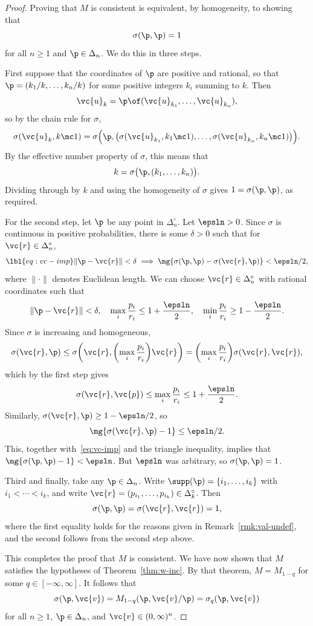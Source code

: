 \begin{proof}
Proving that $M$ is consistent is equivalent, by homogeneity, to showing that
\[
\sigma(\p, \p) = 1
\]
for all $n \geq 1$ and $\p \in \Delta_n$.  We do this in three steps.

First suppose that the coordinates of $\p$ are positive and rational, so
that $\p = (k_1/k, \ldots, k_n/k)$ for some positive integers $k_i$ summing
to $k$.  Then
\[
\vc{u}_k = \p \of (\vc{u}_{k_1}, \ldots, \vc{u}_{k_n}),
\]
so by the chain rule for $\sigma$,
\[
\sigma(\vc{u}_k, k \mc 1)
=
\sigma\Bigl(
\p, \bigl(
\sigma(\vc{u}_{k_1}, k_1 \mc 1), \ldots, \sigma(\vc{u}_{k_n}, k_n \mc 1)
\bigr)
\Bigr).
\]
By the effective number property of $\sigma$, this means that
\[
k = \sigma\bigl( \p, (k_1, \ldots, k_n)\bigr).
\]
Dividing through by $k$ and using the homogeneity of $\sigma$ gives $1 =
\sigma(\p, \p)$, as required.

For the second step, let $\p$ be any point in $\Delta_n^\circ$.  Let
$\epsln > 0$.  Since $\sigma$ is continuous in positive probabilities,
there is some $\delta > 0$ such that for $\vc{r} \in \Delta_n^\circ$,
% 
\begin{equation}
\lbl{eq:vc-imp}
\|\p - \vc{r}\| < \delta
\implies
\mg{\sigma(\p, \p) - \sigma(\vc{r}, \p)} < \epsln/2,
\end{equation}
% 
where $\|\cdot\|$ denotes Euclidean length.  We can choose $\vc{r} \in
\Delta_n^\circ$ with rational coordinates such that
\[
\|\p - \vc{r}\| < \delta,
\quad
\max_i \frac{p_i}{r_i} \leq 1 + \frac{\epsln}{2},
\quad
\min_i \frac{p_i}{r_i} \geq 1 - \frac{\epsln}{2}.
\]
Since $\sigma$ is increasing and homogeneous,
\[
\sigma(\vc{r}, \p) 
\leq
\sigma\biggl(\vc{r}, \biggl(\max_i \frac{p_i}{r_i}\biggr) \vc{r}\biggr)
=
\biggl(\max_i \frac{p_i}{r_i}\biggr) \sigma(\vc{r}, \vc{r}),
\]
which by the first step gives
\[
\sigma(\vc{r}, \vc{p}) \leq \max_i \frac{p_i}{r_i} 
\leq 1 + \frac{\epsln}{2}.
\]
Similarly, $\sigma(\vc{r}, \p) \geq 1 - \epsln/2$, so
\[
\mg{\sigma(\vc{r}, \p) - 1} \leq \epsln/2.
\]
This, together with~\eqref{eq:vc-imp} and the triangle inequality, implies
that $\mg{\sigma(\p, \p) - 1} < \epsln$.  But $\epsln$ was arbitrary, so
$\sigma(\p, \p) = 1$.

Third and finally, take any $\p \in \Delta_n$.  Write $\supp(\p) = \{i_1,
\ldots, i_k\}$ with $i_1 < \cdots < i_k$, and write $\vc{r} =
(p_{i_1}, \ldots, p_{i_k}) \in \Delta_k^\circ$.  Then 
\[
\sigma(\p, \p) = \sigma(\vc{r}, \vc{r}) = 1,
\]
where the first equality holds for the reasons given in
Remark~\ref{rmk:val-undef}, and the second follows from the second step
above. 

This completes the proof that $M$ is consistent.  We have now shown
that $M$ satisfies the hypotheses of Theorem~\ref{thm:w-inc}.  By that
theorem, $M = M_{1 - q}$ for some $q \in [-\infty, \infty]$.  It follows
that
\[
\sigma(\p, \vc{v})
=
M_{1 - q}(\p, \vc{v}/\p)
=
\sigma_q(\p, \vc{v})
\]
for all $n \geq 1$, $\p \in \Delta_n$, and $\vc{v} \in (0, \infty)^n$.
\end{proof}


